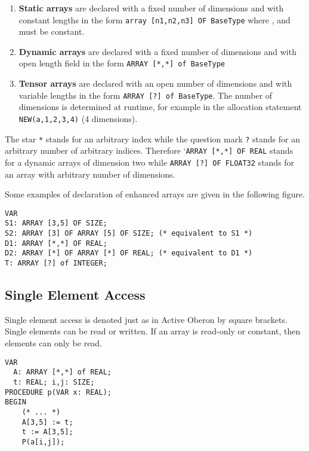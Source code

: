 \documentclass[a4wide,11pt]{article}
\newcommand{\pc}[1]{\makebox{\tt#1}}
\begin{document}
\begin{enumerate}
\item {\bf Static arrays} are declared with a fixed number of dimensions and with constant lengths in the form \lstinline"array [n1,n2,n3] OF BaseType" where \pc{n1}, \pc{n2} and \pc{n3} must be constant.
\item {\bf Dynamic arrays} are declared with a fixed number of dimensions and with open length field in the form
    \lstinline"ARRAY [*,*] of BaseType"
\item {\bf Tensor arrays} are declared with an open number of dimensions and with variable lengths in the form
\lstinline"ARRAY [?] of BaseType".
The number of dimensions is determined at runtime, for example in the allocation statement \lstinline"NEW(a,1,2,3,4)" (4 dimensions).
\end{enumerate}

The star \lstinline"*" stands for an arbitrary index while the question mark \lstinline"?" stands for an arbitrary number of arbitrary indices.
Therefore `\lstinline"ARRAY [*,*] OF REAL" stands for a dynamic arrays of dimension two while \lstinline"ARRAY [?] OF FLOAT32" stands for an array with arbitrary number of dimensions.

Some examples of declaration of enhanced arrays are given in the following figure.
\begin{lstlisting}[style=example,caption=Examples of enhanced array declaration]
VAR
S1: ARRAY [3,5] OF SIZE;
S2: ARRAY [3] OF ARRAY [5] OF SIZE; (* equivalent to S1 *)
D1: ARRAY [*,*] OF REAL;
D2: ARRAY [*] OF ARRAY [*] OF REAL; (* equivalent to D1 *)
T: ARRAY [?] of INTEGER;
\end{lstlisting}

\subsection{Single Element Access}
Single element access is denoted just as in Active Oberon by square brackets.
Single elements can be read or written.
If an array is read-only or constant, then elements can only be read.

\begin{lstlisting}[style=example,caption=Examples of single element access]
VAR
  A: ARRAY [*,*] of REAL;
  t: REAL; i,j: SIZE;
PROCEDURE p(VAR x: REAL);
BEGIN
    (* ... *)
    A[3,5] := t;
    t := A[3,5];
    P(a[i,j]);
\end{lstlisting}
\end{document}
